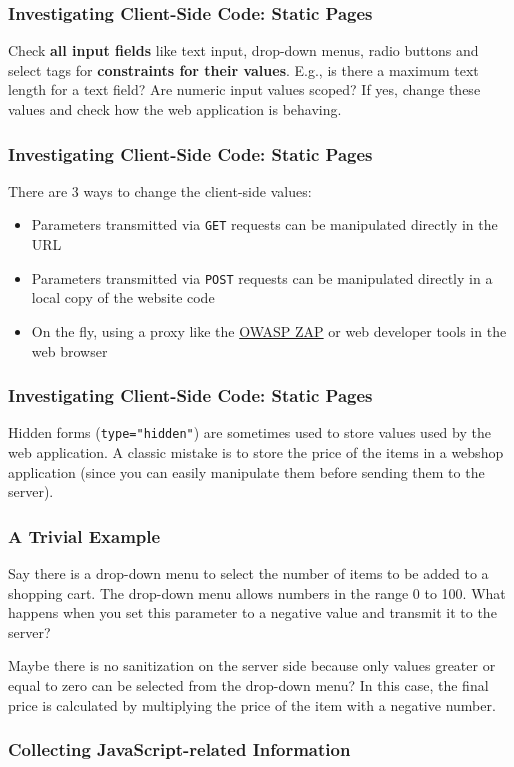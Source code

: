 \documentclass[aspectratio=169]{beamer}
\begin{document}
\begin{frame}
    \frametitle{Investigating Client-Side Code: Static Pages}
    Check \textbf{all input fields} like text input, drop-down menus, radio buttons and select tags for \textbf{constraints for their values}. E.g., is there a maximum text length for a text field? Are numeric input values scoped? If yes, change these values and check how the web application is behaving.
\end{frame}

\begin{frame}
    \frametitle{Investigating Client-Side Code: Static Pages}
    There are 3 ways to change the client-side values:
    \begin{itemize}
        \item Parameters transmitted via \texttt{GET} requests can be manipulated directly in the URL
        \item Parameters transmitted via \texttt{POST} requests can be manipulated directly in a local copy of the website code
        \item On the fly, using a proxy like the \href{https://www.zaproxy.org/}{OWASP ZAP} or web developer tools in the web browser
    \end{itemize}
\end{frame}

\begin{frame}
    \frametitle{Investigating Client-Side Code: Static Pages}
    Hidden forms (\texttt{type="hidden"}) are sometimes used to store values used by the web application. A classic mistake is to store the price of the items in a webshop application (since you can easily manipulate them before sending them to the server).
\end{frame}

\begin{frame}
    \frametitle{A Trivial Example}
    Say there is a drop-down menu to select the number of items to be added to a shopping cart. The drop-down menu allows numbers in the range 0 to 100. What happens when you set this parameter to a negative value and transmit it to the server?
    
    Maybe there is no sanitization on the server side because only values greater or equal to zero can be selected from the drop-down menu? In this case, the final price is calculated by multiplying the price of the item with a negative number.
\end{frame}

\begin{frame}
    \frametitle{Collecting JavaScript-related Information}
\end{frame}
\end{document}
